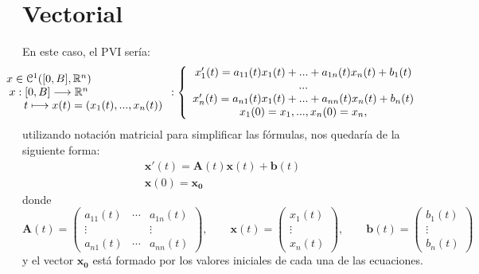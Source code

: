 \section{Vectorial}
En este caso, el PVI sería:
\begin{equation}\label{eq:vect}
 \hspace*{-3cm} 	\begin{array}{c} x \in \mathcal{C}^1([0,B],\R^n) \\ x:[0,B] \longrightarrow \R^n \\ \qquad \qquad \qquad \qquad t \longmapsto x(t) = (x_1(t),...,x_n(t)) \end{array}:\left\lbrace\begin{array}{c} x_1'(t) = a_{11}(t)x_1(t)+...+a_{1n}(t)x_n(t)+b_1(t) \\ ... \\ x_n'(t) = a_{n1}(t)x_1(t)+...+a_{nn}(t)x_n(t)+b_n(t) \\ x_1(0) = x_1,...,x_n(0) =x_n, \end{array}\right.
\end{equation}
utilizando notación matricial para simplificar las fórmulas, nos quedaría de la siguiente forma:
\begin{equation}
	\begin{array}{c}
		\textbf{x}'(t) = \textbf{A}(t)\textbf{x}(t)+\textbf{b}(t) \\ \textbf{x}(0) = \textbf{x}_\textbf{0}
	\end{array}
\end{equation}
donde
\begin{equation}
	\textbf{A}(t) = \begin{pmatrix}
		a_{11}(t) & \cdots & a_{1n}(t)\\ 
		\vdots & & \vdots \\
		a_{n1}(t) & \cdots & a_{nn}(t)
	\end{pmatrix}, \qquad \textbf{x}(t) = \begin{pmatrix}
	x_1(t) \\ \vdots \\ x_n(t)
	\end{pmatrix}, \qquad \textbf{b}(t) = \begin{pmatrix}
	b_1(t) \\ \vdots \\ b_n(t)
	\end{pmatrix}
\end{equation}
y el vector $\textbf{x}_\textbf{0}$ está formado por los valores iniciales de cada una de las ecuaciones.

